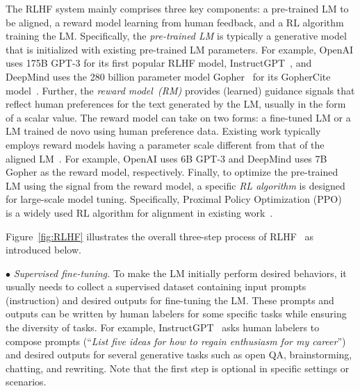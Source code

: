 The RLHF system mainly comprises three key components: a pre-trained LM to be aligned, a reward model learning from human feedback, and a RL algorithm training the LM.  
Specifically, the \textit{pre-trained LM} is typically a generative model that is  initialized with existing pre-trained LM parameters. For example, OpenAI uses 175B GPT-3 for its first popular RLHF model, InstructGPT~\cite{Ouyang-arxiv-2022-Training}, and DeepMind uses the 280 billion parameter model Gopher~\cite{Rae-arxiv-2021-Scaling} for {its GopherCite model~\cite{Menick-arxiv-2022-teaching}. } %
Further, the \textit{reward model~(RM)} provides (learned) guidance signals that reflect human preferences for the text generated by the LM, usually in the form of a scalar value. The reward model can take on two forms: a fine-tuned LM or a LM trained de novo using human preference data.
{Existing work typically employs reward models having  a  parameter scale different from that of the aligned LM~\cite{Menick-arxiv-2022-teaching,Ouyang-arxiv-2022-Training}.} For example, OpenAI uses 6B GPT-3 and DeepMind uses 7B Gopher as the reward model, respectively.
Finally, to optimize the pre-trained LM using the signal from the reward model, a specific \textit{RL algorithm} is designed for large-scale model tuning. Specifically, Proximal Policy Optimization (PPO)~\cite{schulman-arxiv-2017-proximal} is a widely used RL algorithm for alignment in existing work~\cite{Ouyang-arxiv-2022-Training,Menick-arxiv-2022-teaching,Glaese-arxiv-2022-Improving}. 

 Figure~\ref{fig:RLHF} illustrates the overall three-step process of RLHF~\cite{Ouyang-arxiv-2022-Training} as introduced below. 

$\bullet$ \textit{Supervised fine-tuning.} To make the LM initially perform desired behaviors, it  usually needs to collect a supervised dataset containing input prompts (instruction) and desired outputs for fine-tuning the LM. These prompts and outputs can be written by human labelers for some specific  tasks while ensuring the diversity of tasks.  
{For example, InstructGPT~\cite{Ouyang-arxiv-2022-Training} asks human labelers to compose prompts (\eg ``\emph{List five ideas for how to regain enthusiasm for my career}'') and desired outputs for several generative tasks such as open QA, brainstorming, chatting, and rewriting. }
Note that the first step is optional in specific settings or scenarios. 

